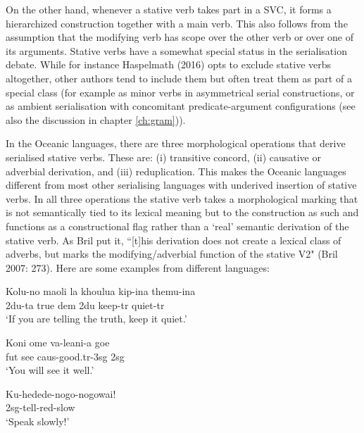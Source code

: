 On the other hand, whenever a stative verb takes part in a SVC, it forms a hierarchized construction together with a main verb. This also follows from the assumption that the modifying verb has scope over the other verb or over one of its arguments. Stative verbs have a somewhat special status in the serialisation debate. While for instance Haspelmath (2016) opts to exclude stative verbs altogether, other authors tend to include them but often treat them as part of a special class (for example as minor verbs in asymmetrical serial constructions, or as ambient serialisation with concomitant predicate-argument configurations (see also the discussion in chapter \ref{ch:gram})). 

In the Oceanic languages, there are three morphological operations that derive serialised stative verbs. These are: (i) transitive concord, (ii) causative or adverbial derivation, and (iii) reduplication. This makes the Oceanic languages different from most other serialising languages with underived insertion of stative verbs. In all three operations the stative verb takes a morphological marking that is not semantically tied to its lexical meaning but to the construction as such and functions as a constructional flag rather than a `real' semantic derivation of the stative verb. As Bril put it, ``[t]his derivation does not create a lexical class of adverbs, but marks the modifying/adverbial function of the stative V2" (Bril 2007: 273). Here are some examples from different languages:

\ea \label{pileni}
\gll Kolu-no maoli la khoulua kip-ina themu-ina \\
\acs{2}\acs{du}-\acs{ta} true \acs{dem} \acs{2}\acs{du} keep-\acs{tr} quiet-\acs{tr} \\
\glft `If you are telling the truth, keep it quiet.’ \\ 
\z
\xe

\ea \label{hoava}
\gll Koni ome va-leani-a goe \\
\acs{fut} see \acs{caus}-good.\acs{tr}-\acs{3}\acs{sg} \acs{2}\acs{sg} \\
\glft `You will see it well.’ \\ 
\z
\xe

\ea \label{saliba}
\gll Ku-hedede-nogo-nogowai! \\
\acs{2}\acs{sg}-tell-\acs{red}-slow \\
\glft `Speak slowly!’ \\ 
\z
\xe


